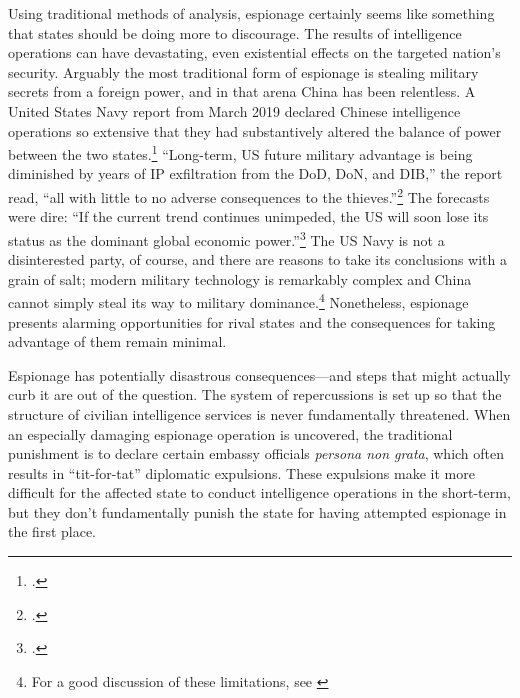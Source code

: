 \documentclass[14pt]{extarticle}
\begin{document}

Using traditional methods of analysis, espionage certainly seems like something that states should be doing more to discourage. The results of intelligence operations can have devastating, even existential effects on the targeted nation's security. Arguably the most traditional form of espionage is stealing military secrets from a foreign power, and in that arena China has been relentless. A United States Navy report from March 2019 declared Chinese intelligence operations so extensive that they had substantively altered the balance of power between the two states.\footcite{lubold_navy_2019} ``Long-term, US future military advantage is being diminished by years of IP exfiltration from the DoD, DoN, and DIB,'' the report read, ``all with little to no adverse consequences to the thieves.''\footcite[p.~6]{bayer_cybersecurity_2019} The forecasts were dire: ``If the current trend continues unimpeded, the US will soon lose its status as the dominant global economic power.''\footcite[p.~5]{bayer_cybersecurity_2019} The US Navy is not a disinterested party, of course, and there are reasons to take its conclusions with a grain of salt; modern military technology is remarkably complex and China cannot simply steal its way to military dominance.\footnote{For a good discussion of these limitations, see \cite{gilli_why_2019}} Nonetheless, espionage presents alarming opportunities for rival states and the consequences for taking advantage of them remain minimal.

Espionage has potentially disastrous consequences---and steps that might actually curb it are out of the question. The system of repercussions is set up so that the structure of civilian intelligence services is never fundamentally threatened. When an especially damaging espionage operation is uncovered, the traditional punishment is to declare certain embassy officials \emph{persona non grata}, which often results in \enquote{tit-for-tat} diplomatic expulsions. These expulsions make it more difficult for the affected state to conduct intelligence operations in the short-term, but they don't fundamentally punish the state for having attempted espionage in the first place.
\end{document}
